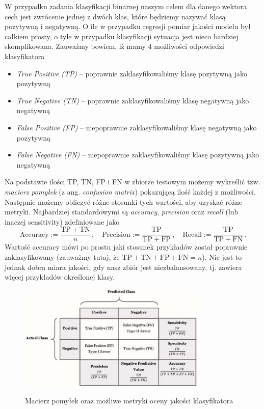 \documentclass{myclass}
\numberwithin{equation}{subsection}
\begin{document}
W przypadku zadania klasyfikacji binarnej naszym celem dla danego wektora cech jest zwrócenie jednej
z dwóch klas, które będziemy nazywać klasą pozytywną i negatywną. O ile w przypadku regresji pomiar
jakości modelu był całkiem prosty, o tyle w przypadku klasyfikacji sytuacja jest nieco bardziej
skomplikowana. Zauważmy bowiem, iż mamy 4 możliwości odpowiedzi klasyfikatora
\begin{itemize}
    \item \textit{True Positive (TP)} -- poprawnie zaklasyfikowaliśmy klasę pozytywną jako pozytywną
    \item \textit{True Negative (TN)} -- poprawnie zaklasyfikowaliśmy klasę negatywną jako negatywną
    \item \textit{False Positive (FP)} -- niepoprawnie zaklasyfikowaliśmy klasę negatywną jako
    pozytywną
    \item \textit{False Negative (FN)} -- niepoprawnie zaklasyfikowaliśmy klasę pozytywną jako
    negatywną
\end{itemize}

Na podstawie ilości TP, TN, FP i FN w zbiorze testowym możemy wykreślić tzw. \emph{macierz pomyłek}
(z ang. \textit{confusion matrix}) pokazującą ilość każdej z możliwości. Następnie możemy obliczyć
różne stosunki tych wartości, aby uzyskać różne metryki. Najbardziej standardowymi są
\emph{accuracy}, \emph{precision} oraz \emph{recall} (lub inaczej sensitivity) zdefiniowane jako
\begin{equation}
    \mathrm{Accuracy} := \frac{\mathrm{TP} + \mathrm{TN}}{n}\,,\quad\mathrm{Precision} := \frac{\mathrm{TP}}{\mathrm{TP} + \mathrm{FP}}\,,\quad\mathrm{Recall} := \frac{\mathrm{TP}}{\mathrm{TP} + \mathrm{FN}}\,.
\end{equation}
Wartość accuracy mówi po prostu jaki stosunek przykładów został poprawnie zaklasyfikowany (zauważmy
tutaj, że \(\mathrm{TP + TN + FP + FN} = n\)). Nie jest to jednak dobra miara jakości, gdy nasz
zbiór jest niezbalansowany, tj. zawiera więcej przykładów określonej klasy.

\begin{figure}[ht]
    \centering
    \includegraphics[width=0.8\textwidth]{figs/confusionMatrix.jpg}
    \label{fig:confusionMatrix}
    \caption{Macierz pomyłek oraz możliwe metryki oceny jakości klasyfikatora}
\end{figure}
\end{document}
